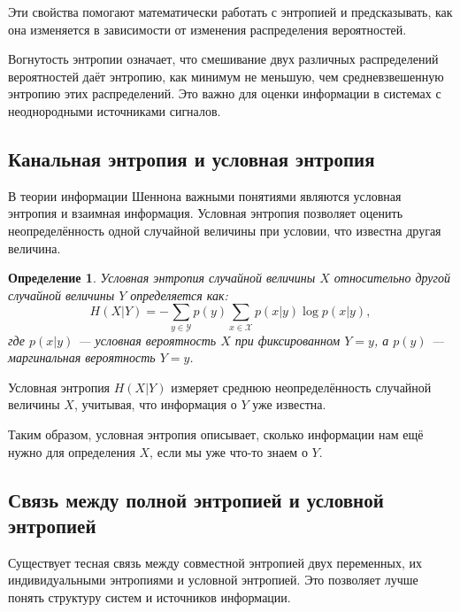 \documentclass[12pt,a4paper]{article}
\newtheorem{definition}{Определение}[section]
\newenvironment{defbox}[1][]{%
  \begin{tcolorbox}[enhanced, breakable, colback=defcolor, colframe=green!50!black, title=#1, fonttitle=\bfseries, arc=3pt, boxrule=0.5pt]
}{\end{tcolorbox}}
\newenvironment{rembox}[1][]{%
  \begin{tcolorbox}[enhanced, breakable, colback=gray!5, colframe=gray!50, title=#1, fonttitle=\bfseries, arc=3pt, boxrule=0.5pt]
}{\end{tcolorbox}}
\begin{document}
Эти свойства помогают математически работать с энтропией и предсказывать, как она изменяется в зависимости от изменения распределения вероятностей.

\begin{rembox}[Практическое значение вогнутости энтропии]
Вогнутость энтропии означает, что смешивание двух различных распределений вероятностей даёт энтропию, как минимум не меньшую, чем средневзвешенную энтропию этих распределений. Это важно для оценки информации в системах с неоднородными источниками сигналов.
\end{rembox}
\subsection{Канальная энтропия и условная энтропия}

В теории информации Шеннона важными понятиями являются условная энтропия и взаимная информация. Условная энтропия позволяет оценить неопределённость одной случайной величины при условии, что известна другая величина.

\begin{defbox}[Условная энтропия]
\begin{definition}
Условная энтропия случайной величины $X$ относительно другой случайной величины $Y$ определяется как:
\[
H(X|Y) = - \sum_{y \in \mathcal{Y}} p(y) \sum_{x \in \mathcal{X}} p(x|y) \log p(x|y),
\]
где $p(x|y)$ — условная вероятность $X$ при фиксированном $Y=y$, а $p(y)$ — маргинальная вероятность $Y=y$.
\end{definition}
\end{defbox}

\begin{rembox}[Смысл условной энтропии]
Условная энтропия $H(X|Y)$ измеряет среднюю неопределённость случайной величины $X$, учитывая, что информация о $Y$ уже известна. 
\end{rembox}

Таким образом, условная энтропия описывает, сколько информации нам ещё нужно для определения $X$, если мы уже что-то знаем о $Y$.

\subsection{Связь между полной энтропией и условной энтропией}

Существует тесная связь между совместной энтропией двух переменных, их индивидуальными энтропиями и условной энтропией. Это позволяет лучше понять структуру систем и источников информации.
\end{document}
